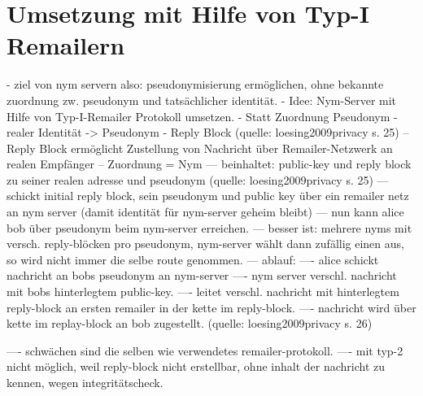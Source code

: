 \section{Umsetzung mit Hilfe von Typ-I Remailern}
- ziel von nym servern also: pseudonymisierung ermöglichen, ohne bekannte zuordnung zw. pseudonym und tatsächlicher identität.
- Idee: Nym-Server mit Hilfe von Typ-I-Remailer Protokoll umsetzen.
- Statt Zuordnung Pseudonym - realer Identität -> Pseudonym - Reply Block (quelle: loesing2009privacy s. 25)
-- Reply Block ermöglicht Zustellung von Nachricht über Remailer-Netzwerk an realen Empfänger
-- Zuordnung = Nym
--- beinhaltet: public-key und reply block zu seiner realen adresse und pseudonym (quelle: loesing2009privacy s. 25)
--- schickt initial reply block, sein pseudonym und public key über ein remailer netz an nym server (damit identität für nym-server geheim bleibt)
--- nun kann alice bob über pseudonym beim nym-server erreichen.
--- besser ist: mehrere nyms mit versch. reply-blöcken pro pseudonym, nym-server wählt dann zufällig einen aus, so wird nicht immer die selbe route genommen.
--- ablauf:
---- alice schickt nachricht an bobs pseudonym an nym-server
---- nym server verschl. nachricht mit bobs hinterlegtem public-key.
---- leitet verschl. nachricht mit hinterlegtem reply-block an ersten remailer in der kette im reply-block.
---- nachricht wird über kette im replay-block an bob zugestellt. (quelle: loesing2009privacy s. 26)

---- schwächen sind die selben wie verwendetes remailer-protokoll.
---- mit typ-2 nicht möglich, weil reply-block nicht erstellbar, ohne inhalt der nachricht zu kennen, wegen integritätscheck.